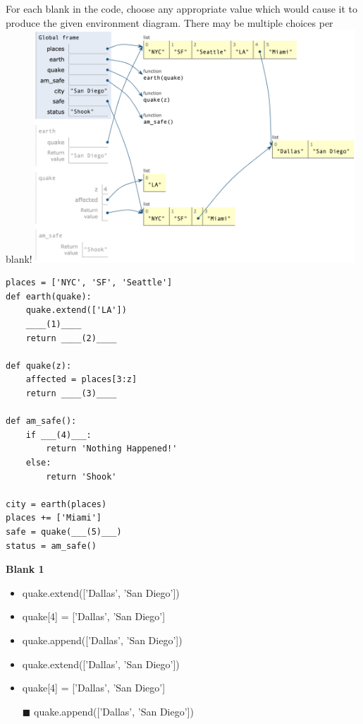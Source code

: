 \renewcommand{\labelitemi}{$\square$}
For each blank in the code, choose any appropriate value which would cause it to produce the given environment diagram. There may be multiple choices per blank!
\newline
\includegraphics[width= 12cm]{rev-env.png}
\begin{lstlisting}
places = ['NYC', 'SF', 'Seattle']
def earth(quake):
    quake.extend(['LA'])
    ____(1)____
    return ____(2)____
    
def quake(z):
    affected = places[3:z]
    return ____(3)____
    
def am_safe():
    if ___(4)___:
        return 'Nothing Happened!'
    else:
        return 'Shook'
        
city = earth(places)
places += ['Miami']
safe = quake(___(5)___)
status = am_safe()
\end{lstlisting}

\textbf{Blank 1}
\begin{itemize}
    \item quake.extend(['Dallas', 'San Diego'])
    \item quake[4] = ['Dallas', 'San Diego']
    \item quake.append(['Dallas', 'San Diego'])
\end{itemize}
\begin{solution}[.25in]
\begin{itemize}
    \item quake.extend(['Dallas', 'San Diego'])
    \item quake[4] = ['Dallas', 'San Diego']
    \item[$\blacksquare$] quake.append(['Dallas', 'San Diego'])
\end{itemize}
\end{solution}


